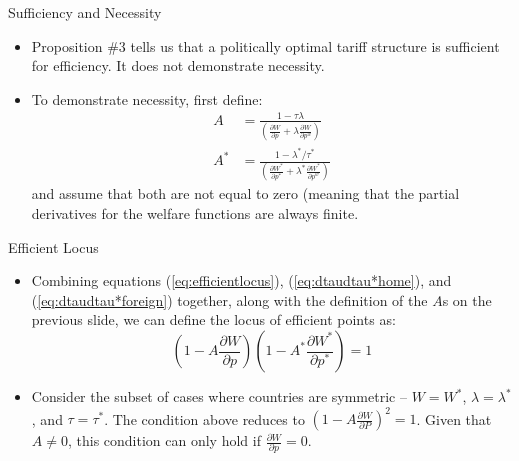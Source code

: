 \documentclass[aspectratio=169]{beamer}
\begin{document}
\begin{frame}{Sufficiency and Necessity}

\begin{itemize}
    \item<1-> Proposition \#3 tells us that a politically optimal tariff structure is sufficient for efficiency.  It does not demonstrate necessity.
    \item<2-> To demonstrate necessity, first define:
    \begin{align}
        A &= \frac{1 - \tau \lambda}{\left( \frac{\partial W}{\partial p} + \lambda \frac{\partial W}{\partial p^{w}} \right)} \label{eq:Ahome} \\
        A^{*} &= \frac{1 - \lambda^{*} / \tau^{*}}{\left( \frac{\partial W^{*}}{\partial p^{*}} + \lambda^{*} \frac{\partial W^{*}}{\partial p^{w}} \right)} \label{eq:Aforeign}
    \end{align}
    and assume that both are not equal to zero (meaning that the partial derivatives for the welfare functions are always finite.
\end{itemize}
    
\end{frame}


\begin{frame}{Efficient Locus}

\begin{itemize}
    \item<1-> Combining equations (\ref{eq:efficientlocus}), (\ref{eq:dtaudtau*home}), and (\ref{eq:dtaudtau*foreign}) together, along with the definition of the $ A $s on the previous slide, we can define the locus of efficient points as:
    \begin{equation*}
        \left( 1 - A \frac{\partial W}{\partial p} \right) \left( 1 - A^{*} \frac{\partial W^{*}}{\partial p^{*}} \right) = 1
    \end{equation*}
    \item<2-> Consider the subset of cases where countries are symmetric – $ W = W^{*} $, $ \lambda = \lambda^{*} $, and $ \tau = \tau^{*} $.  The condition above reduces to $ \left( 1 - A \frac{\partial W}{\partial P} \right)^{2} = 1 $.  Given that $ A \neq 0 $, this condition can only hold if $ \frac{\partial W}{\partial p} = 0 $.
\end{itemize}
    
\end{frame}
\end{document}
